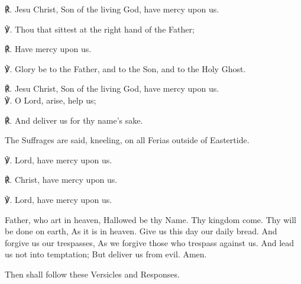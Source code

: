 \begin{multicols}{2}
℟. Jesu Christ, Son of the living God, have mercy upon us.

℣. Thou that sittest at the right hand of the Father;

℟. Have mercy upon us.

℣. Glory be to the Father, and to the Son, and to the Holy Ghost.

℟. Jesu Christ, Son of the living God, have mercy upon us.\\

℣. O Lord, arise, help us;

℟. And deliver us for thy name’s sake.

\begin{rubric}
	The Suffrages are said, kneeling, on all Ferias outside of Eastertide.
\end{rubric}
℣. Lord, have mercy upon us.

℟. Christ, have mercy upon us.

℣. Lord, have mercy upon us.

 Father, who art in heaven, Hallowed be thy Name. Thy kingdom come. Thy will be done on earth, As it is in heaven. Give us this day our daily bread. And forgive us our trespasses, As we forgive those who trespass against us. And lead us not into temptation; But deliver us from evil. Amen.

\begin{rubric}
	Then shall follow these Versicles and Responses.
\end{rubric}










\end{multicols}
